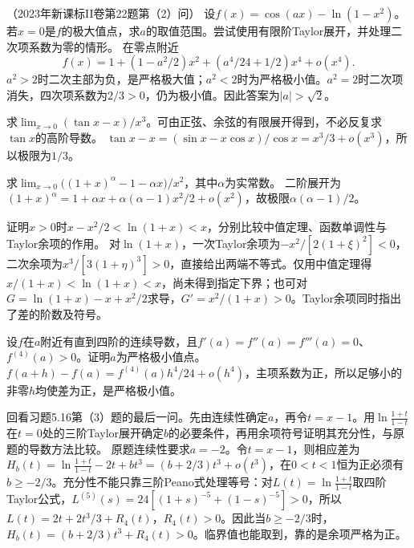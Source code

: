 （2023年新课标II卷第22题第（2）问）
设\(f(x)=\cos(ax)-\ln(1-x^2)\)。若\(x=0\)是\(f\)的极大值点，求\(a\)的取值范围。尝试使用有限阶Taylor展开，并处理二次项系数为零的情形。
\solutionanswer
在零点附近
\[
 f(x)=1+(1-a^2/2)x^2+(a^4/24+1/2)x^4+o(x^4).
\]
\(a^2>2\)时二次主部为负，是严格极大值；\(a^2<2\)时为严格极小值。\(a^2=2\)时二次项消失，四次项系数为\(2/3>0\)，仍为极小值。因此答案为\(|a|>\sqrt2\)。


求\(\lim_{x\to0}(\tan x-x)/x^3\)。可由正弦、余弦的有限展开得到，不必反复求\(\tan x\)的高阶导数。
\solutionanswer
\(\tan x-x=(\sin x-x\cos x)/\cos x=x^3/3+o(x^3)\)，所以极限为\(1/3\)。


求\(\lim_{x\to0}\bigl((1+x)^\alpha-1-\alpha x\bigr)/x^2\)，其中\(\alpha\)为实常数。
\solutionanswer
二阶展开为\((1+x)^\alpha=1+\alpha x+\alpha(\alpha-1)x^2/2+o(x^2)\)，故极限\(\alpha(\alpha-1)/2\)。


证明\(x>0\)时\(x-x^2/2<\ln(1+x)<x\)，分别比较中值定理、函数单调性与Taylor余项的作用。
\solutionanswer
对\(\ln(1+x)\)，一次Taylor余项为\(-x^2/[2(1+\xi)^2]<0\)，二次余项为\(x^3/[3(1+\eta)^3]>0\)，直接给出两端不等式。仅用中值定理得\(x/(1+x)<\ln(1+x)<x\)，尚未得到指定下界；也可对\(G=\ln(1+x)-x+x^2/2\)求导，\(G'=x^2/(1+x)>0\)。Taylor余项同时指出了差的阶数及符号。


设\(f\)在\(a\)附近有直到四阶的连续导数，且\(f'(a)=f''(a)=f'''(a)=0\)、\(f^{(4)}(a)>0\)。证明\(a\)为严格极小值点。
\solutionanswer
\(f(a+h)-f(a)=f^{(4)}(a)h^4/24+o(h^4)\)，主项系数为正，所以足够小的非零\(h\)均使差为正，是严格极小值。


回看习题5.16第（3）题的最后一问。先由连续性确定\(a\)，再令\(t=x-1\)。用\(\ln\frac{1+t}{1-t}\)在\(t=0\)处的三阶Taylor展开确定\(b\)的必要条件，再用余项符号证明其充分性，与原题的导数方法比较。
\solutionanswer
原题连续性要求\(a=-2\)。令\(t=x-1\)，则相应差为\(H_b(t)=\ln\frac{1+t}{1-t}-2t+bt^3=(b+2/3)t^3+o(t^3)\)，在\(0<t<1\)恒为正必须有\(b\ge-2/3\)。充分性不能只靠三阶Peano式处理等号：对\(L(t)=\ln\frac{1+t}{1-t}\)取四阶Taylor公式，\(L^{(5)}(s)=24[(1+s)^{-5}+(1-s)^{-5}]>0\)，所以\(L(t)=2t+2t^3/3+R_4(t)\)，\(R_4(t)>0\)。因此当\(b\ge-2/3\)时，\(H_b(t)=(b+2/3)t^3+R_4(t)>0\)。临界值也能取到，靠的是余项严格为正。

